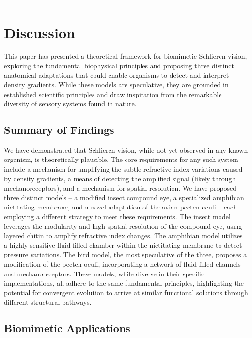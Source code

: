 \documentclass[11pt]{article}
\begin{document}
\bigskip\noindent\rule{\linewidth}{0.4pt}\bigskip

\section{Discussion}

This paper has presented a theoretical framework for biomimetic Schlieren vision, exploring the fundamental biophysical principles and proposing three distinct anatomical adaptations that could enable organisms to detect and interpret density gradients. While these models are speculative, they are grounded in established scientific principles and draw inspiration from the remarkable diversity of sensory systems found in nature.

\subsection{Summary of Findings}

We have demonstrated that Schlieren vision, while not yet observed in any known organism, is theoretically plausible. The core requirements for any such system include a mechanism for amplifying the subtle refractive index variations caused by density gradients, a means of detecting the amplified signal (likely through mechanoreceptors), and a mechanism for spatial resolution. We have proposed three distinct models – a modified insect compound eye, a specialized amphibian nictitating membrane, and a novel adaptation of the avian pecten oculi – each employing a different strategy to meet these requirements. The insect model leverages the modularity and high spatial resolution of the compound eye, using layered chitin to amplify refractive index changes. The amphibian model utilizes a highly sensitive fluid-filled chamber within the nictitating membrane to detect pressure variations. The bird model, the most speculative of the three, proposes a modification of the pecten oculi, incorporating a network of fluid-filled channels and mechanoreceptors. These models, while diverse in their specific implementations, all adhere to the same fundamental principles, highlighting the potential for convergent evolution to arrive at similar functional solutions through different structural pathways.

\subsection{Biomimetic Applications}
\end{document}
